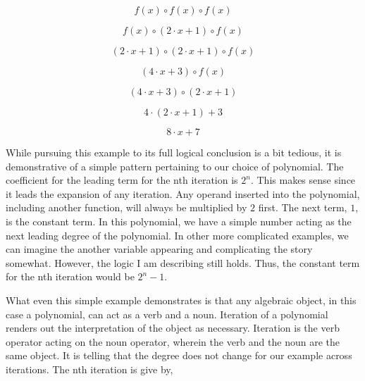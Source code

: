 \documentclass[12pt]{article}
\begin{document}
\begin{equation}
    f(x) \circ f(x) \circ f(x)
\end{equation}

\begin{equation}
    f(x) \circ (2 \cdot x + 1) \circ f(x)
\end{equation}

\begin{equation}
    (2 \cdot x + 1) \circ (2 \cdot x + 1) \circ f(x)
\end{equation}

\begin{equation}
    ( 4 \cdot x + 3) \circ f(x)
\end{equation}

\begin{equation}
    ( 4 \cdot x + 3) \circ (2 \cdot x + 1)
\end{equation}

\begin{equation}
    4 \cdot (2 \cdot x + 1) + 3
\end{equation}

\begin{equation}
    8 \cdot x + 7
\end{equation}

While pursuing this example to its full logical conclusion is a bit tedious, it
is demonstrative of a simple pattern pertaining to our choice of polynomial.
The coefficient for the leading term for the nth iteration is $2^n$. This makes
sense since it leads the expansion of any iteration. Any operand inserted into
the polynomial, including another function, will always be multiplied by $2$
first. The next term, $1$, is the constant term. In this polynomial, we have a
simple number acting as the next leading degree of the polynomial. In other
more complicated examples, we can imagine the another variable appearing and
complicating the story somewhat. However, the logic I am describing still
holds. Thus, the constant term for the nth iteration would be $2^n - 1$.

What even this simple example demonstrates is that any algebraic object, in
this case a polynomial, can act as a verb and a noun. Iteration of a polynomial
renders out the interpretation of the object as necessary. Iteration is the
verb operator acting on the noun operator, wherein the verb and the noun are
the same object. It is telling that the degree does not change for our example
across iterations. The nth iteration is give by,
\end{document}
